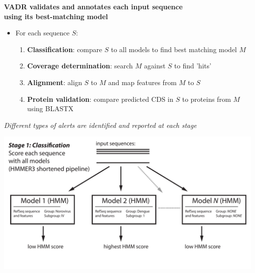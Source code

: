 \documentclass[landscape]{slides}
\begin{document}
\begin{slide}
\begin{center}
\textbf{VADR validates and annotates each input sequence \\ using its 
  best-matching model}

\begin{itemize}
\item For each sequence $S$:
\small
\begin{enumerate}
\item \textbf{Classification}: compare $S$ to all models to find best matching model $M$
\item \textbf{Coverage determination}: search $M$ against $S$ to find 'hits'
\item \textbf{Alignment}: align $S$ to $M$ and map features from $M$ to $S$
\item \textbf{Protein validation}: compare predicted CDS in $S$ to proteins
  from $M$ using BLASTX
\end{enumerate}
\end{itemize}

\emph{Different types of alerts are identified and reported at each stage}

\end{center}

\vfill
\end{slide}
\begin{slide}
\begin{center}

\includegraphics[width=9.5in]{figs/v-annotate-stage1-1}

\end{center}
\vfill
\end{slide}
\end{document}
